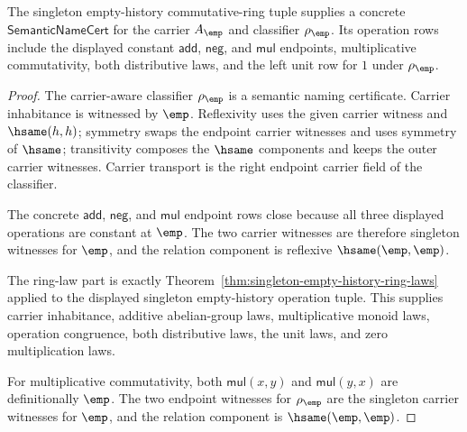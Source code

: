 \begin{theorem}
\label{thm:singleton-empty-history-commring-laws}
The singleton empty-history commutative-ring tuple supplies a concrete
$\mathsf{SemanticNameCert}$ for the carrier $A_{\emp}$ and classifier
$\rho_{\emp}$. Its operation rows include the displayed constant
$\mathsf{add}$, $\mathsf{neg}$, and $\mathsf{mul}$ endpoints, multiplicative
commutativity, both distributive laws, and the left unit row for
$1$ under $\rho_{\emp}$.
\end{theorem}
\begin{proof}
The carrier-aware classifier $\rho_{\emp}$ is a semantic naming certificate.
Carrier inhabitance is witnessed by $\emp$. Reflexivity uses the given carrier
witness and $\hsame(h,h)$; symmetry swaps the endpoint carrier witnesses and
uses symmetry of $\hsame$; transitivity composes the $\hsame$ components and
keeps the outer carrier witnesses. Carrier transport is the right endpoint
carrier field of the classifier.

The concrete $\mathsf{add}$, $\mathsf{neg}$, and $\mathsf{mul}$ endpoint rows
close because all three displayed operations are constant at $\emp$. The two
carrier witnesses are therefore singleton witnesses for $\emp$, and the
relation component is reflexive $\hsame(\emp,\emp)$.

The ring-law part is exactly Theorem~\ref{thm:singleton-empty-history-ring-laws}
applied to the displayed singleton empty-history operation tuple. This supplies
carrier inhabitance, additive abelian-group laws, multiplicative monoid laws,
operation congruence, both distributive laws, the unit laws, and zero
multiplication laws.

For multiplicative commutativity, both $\mathsf{mul}(x,y)$ and
$\mathsf{mul}(y,x)$ are definitionally $\emp$. The two endpoint witnesses for
$\rho_{\emp}$ are the singleton carrier witnesses for $\emp$, and the relation
component is $\hsame(\emp,\emp)$.
\end{proof}

